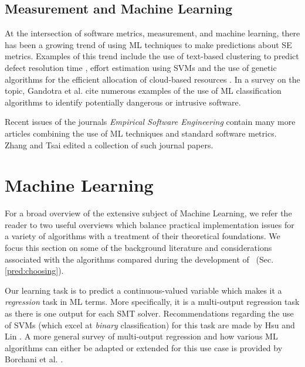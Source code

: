 \subsection{Measurement and Machine Learning}
\label{sub:lrmmml}

At the intersection of software metrics, measurement, and machine learning, there has been a growing trend of using ML techniques to make predictions about SE metrics. Examples of this trend include the use of text-based clustering to predict defect resolution time \cite{Assar2016}, effort estimation using SVMs \cite{Song:2014:PBR:2639490.2639510} and the use of genetic algorithms for the efficient allocation of cloud-based resources \cite{cloudML}. In a survey on the topic, Gandotra et al. \cite{ClassificationSurvey} cite numerous examples of the use of ML classification algorithms to identify potentially dangerous or intrusive software. 

Recent issues of the journals \textit{Empirical Software Engineering} contain many more articles combining the use of ML techniques and standard software metrics. Zhang and Tsai \cite{ML4SE} edited a collection of such journal papers.  

\section{Machine Learning}
\label{sec:lrml}

For a broad overview of the extensive subject of Machine Learning, we refer the reader to two useful overviews \cite{Bishop, Mitchell} which balance practical implementation issues for a variety of algorithms with a treatment of their theoretical foundations. 
We focus this section on some of the background literature and considerations associated with the algorithms compared during the development of \where~(Sec. \ref{pred:choosing}).

Our learning task is to predict a continuous-valued variable which makes it a \textit{regression} task in ML terms. More specifically, it is a multi-output regression task as there is one output for each SMT solver. Recommendations regarding the use of SVMs (which excel at \textit{binary} classification) for this task are made by Hsu and Lin \cite{MulticlassSVM}. A more general survey of multi-output regression and how various ML algorithms can either be adapted or extended for this use case is provided by Borchani et al. \cite{multisurvey}. 

